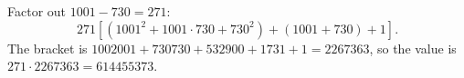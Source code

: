 Factor out $1001-730=271$:
\[271\left[\left(1001^2+1001\cdot730+730^2\right)+(1001+730)+1\right].\]
The bracket is $1002001+730730+532900+1731+1=2267363$, so the value is $271\cdot2267363=\boxed{614455373}$.
